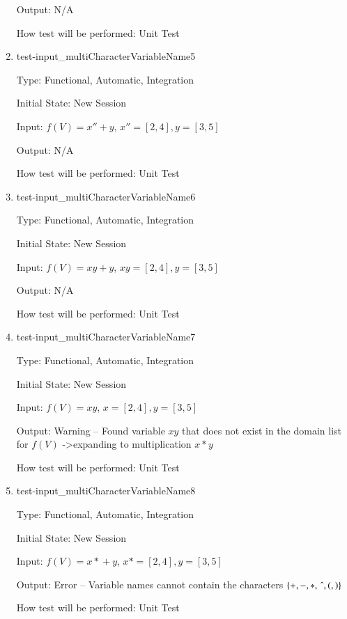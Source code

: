 \documentclass[12pt, titlepage]{article}
\begin{document}
\begin{enumerate}
	Output: N/A
	
	How test will be performed: Unit Test\\
	
	\item{test-input\_multiCharacterVariableName5}
	
	Type: Functional, Automatic, Integration
	
	Initial State: New Session
	
	Input: $f(V) = x'' + y$, $x'' = [2,4], y = [3,5]$
	
	Output: N/A
	
	How test will be performed: Unit Test\\
	
	\item{test-input\_multiCharacterVariableName6}
	
	Type: Functional, Automatic, Integration
	
	Initial State: New Session
	
	Input: $f(V) = xy + y$, $xy = [2,4], y = [3,5]$
	
	Output: N/A
	
	How test will be performed: Unit Test\\
	
	\item{test-input\_multiCharacterVariableName7}
	
	Type: Functional, Automatic, Integration
	
	Initial State: New Session
	
	Input: $f(V) = xy$, $x = [2,4], y = [3,5]$
	
	Output: Warning -- Found variable $xy$ that does not exist in the domain 
	list for $f(V)$ -\textgreater expanding to multiplication $x * y$
	
	How test will be performed: Unit Test\\
	
	\item{test-input\_multiCharacterVariableName8}
	
	Type: Functional, Automatic, Integration
	
	Initial State: New Session
	
	Input: $f(V) = \mathit{x*} + y$, $x* = [2,4], y = [3,5]$
	
	Output: Error -- Variable names cannot contain the characters $\{+, - , *, 
	\, \string^, (, )\}$
	
	How test will be performed: Unit Test\\
	
\end{enumerate}
\end{document}
